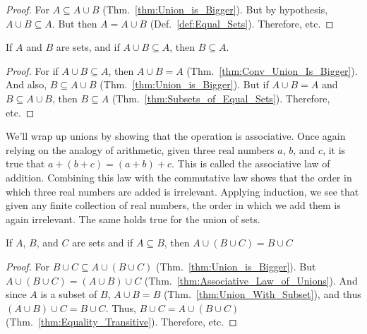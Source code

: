         \begin{proof}
            For $A\subseteq{A}\cup{B}$
            (Thm.~\ref{thm:Union_is_Bigger}). But by
            hypothesis, $A\cup{B}\subseteq{A}$. But then
            $A=A\cup{B}$ (Def.~\ref{def:Equal_Sets}).
            Therefore, etc.
        \end{proof}
        \begin{theorem}
            \label{thm:Union_is_Equal}%
            If $A$ and $B$ are sets, and if
            $A\cup{B}\subseteq{A}$, then $B\subseteq{A}$.
        \end{theorem}
        \begin{proof}
            For if $A\cup{B}\subseteq{A}$, then
            $A\cup{B}=A$
            (Thm.~\ref{thm:Conv_Union_Is_Bigger}). And also,
            $B\subseteq{A}\cup{B}$
            (Thm.~\ref{thm:Union_is_Bigger}). But if
            $A\cup{B}=A$ and $B\subseteq{A}\cup{B}$, then
            $B\subseteq{A}$
            (Thm.~\ref{thm:Subsets_of_Equal_Sets}).
            Therefore, etc.
        \end{proof}
        We'll wrap up unions by showing that the operation
        is associative. Once again relying on the analogy
        of arithmetic, given three real numbers $a$, $b$,
        and $c$, it is true that $a+(b+c)=(a+b)+c$. This
        is called the associative law of addition. Combining
        this law with the commutative law shows that the
        order in which three real numbers are added is
        irrelevant. Applying induction, we see that given
        any finite collection of real numbers, the order in
        which we add them is again irrelevant. The same holds
        true for the union of sets.
        \begin{theorem}
            \label{thm:Redundant_Union}%
            If $A$, $B$, and $C$ are sets and if $A\subseteq{B}$, then
            $A\cup(B\cup{C})=B\cup{C}$
        \end{theorem}
        \begin{proof}
            For $B\cup{C}\subseteq{A}\cup(B\cup{C})$
            (Thm.~\ref{thm:Union_is_Bigger}). But
            $A\cup(B\cup{C})=(A\cup{B})\cup{C}$
            (Thm.~\ref{thm:Associative_Law_of_Unions}).
            And since $A$ is a subset of $B$, $A\cup{B}=B$
            (Thm.~\ref{thm:Union_With_Subset}), and thus
            $(A\cup{B})\cup{C}=B\cup{C}$. Thus, $B\cup{C}=A\cup(B\cup{C})$
            (Thm.~\ref{thm:Equality_Transitive}). Therefore, etc.
        \end{proof}
